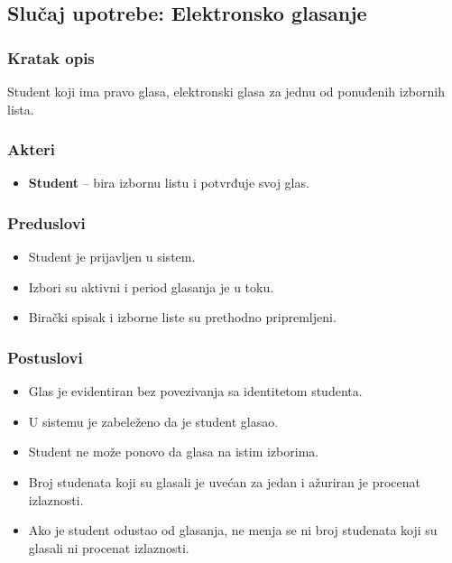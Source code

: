\subsection{Slučaj upotrebe: Elektronsko glasanje}

\subsubsection*{Kratak opis}
Student koji ima pravo glasa, elektronski glasa za jednu od ponuđenih izbornih lista.

\subsubsection*{Akteri}
\begin{itemize}
    \item \textbf{Student} -- bira izbornu listu i potvrđuje svoj glas.
\end{itemize}

\subsubsection*{Preduslovi}
\begin{itemize}
    \item Student je prijavljen u sistem.
    \item Izbori su aktivni i period glasanja je u toku.
    \item Birački spisak i izborne liste su prethodno pripremljeni.
\end{itemize}

\subsubsection*{Postuslovi}
\begin{itemize}
    \item Glas je evidentiran bez povezivanja sa identitetom studenta.
    \item U sistemu je zabeleženo da je student glasao.
    \item Student ne može ponovo da glasa na istim izborima.
    \item Broj studenata koji su glasali je uvećan za jedan i ažuriran je procenat izlaznosti.
    \item Ako je student odustao od glasanja, ne menja se ni broj studenata koji su glasali ni procenat izlaznosti.
\end{itemize}

